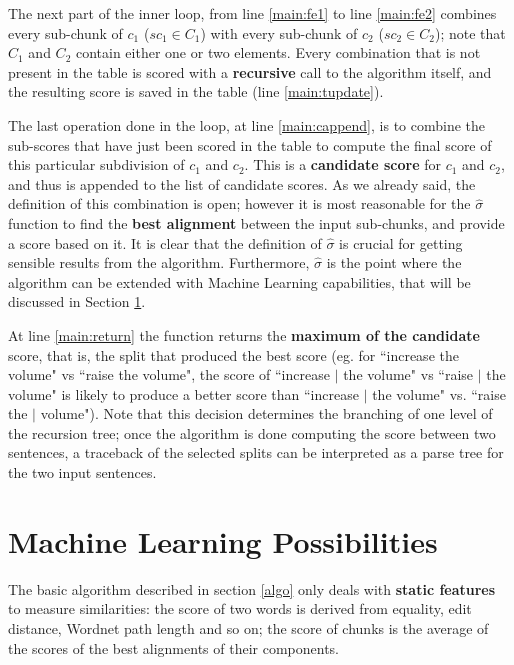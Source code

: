 The next part of the inner loop, from line \ref{main:fe1} to line \ref{main:fe2} combines every sub-chunk of $c_1$ ($sc_1 \in C_1$) with every sub-chunk of $c_2$ ($sc_2 \in C_2$); note that $C_1$ and $C_2$ contain either one or two elements. Every combination that is not present in the table is scored with a \textbf{recursive} call to the algorithm itself, and the resulting score is saved in the table (line \ref{main:tupdate}).

The last operation done in the loop, at line \ref{main:cappend}, is to combine the sub-scores that have just been scored in the table to compute the final score of this particular subdivision of $c_1$ and $c_2$. This is a \textbf{candidate score} for $c_1$ and $c_2$, and thus is appended to the list of candidate scores. As we already said, the definition of this combination is open; however it is most reasonable for the $\hat{\sigma}$ function to find the \textbf{best alignment} between the input sub-chunks, and provide a score based on it. It is clear that the definition of $\hat{\sigma}$ is crucial for getting sensible results from the algorithm. Furthermore, $\hat{\sigma}$ is the point where the algorithm can be extended with Machine Learning capabilities, that will be discussed in Section \ref{learning}.

At line \ref{main:return} the function returns the \textbf{maximum of the candidate} score, that is, the split that produced the best score (eg. for ``increase the volume" vs ``raise the volume", the score of ``increase $\vert$ the volume" vs ``raise $\vert$ the volume" is likely to produce a better score than ``increase $\vert$ the volume" vs. ``raise the $\vert$ volume"). Note that this decision determines the branching of one level of the recursion tree; once the algorithm is done computing the score between two sentences, a traceback of the selected splits can be interpreted as a parse tree for the two input sentences.


\section{Machine Learning Possibilities} \label{learning}
The basic algorithm described in section \ref{algo} only deals with \textbf{static features} to measure similarities: the score of two words is derived from equality, edit distance, Wordnet path length and so on; the score of chunks is the average of the scores of the best alignments of their components.

